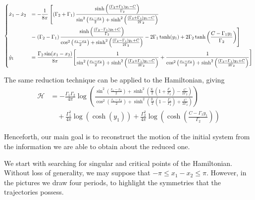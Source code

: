 \documentclass[11pt,twoside]{article}
\theoremstyle{definition}
\numberwithin{equation}{section}
\begin{document}
\begin{footnotesize}
    \begin{equation}
        \begin{dcases}
        \dot{x}_1-\dot{x}_2 &= -\frac{1}{8\pi}\left[\left(\Gamma_2 + \Gamma_1\right)\frac{\sinh\left(\frac{(\Gamma_2+\Gamma_1)y_1-C}{\Gamma_2}\right)}{\sin^2\left(\frac{x_1-x_2}{2}\right) + \sinh^2\left(\frac{(\Gamma_2+\Gamma_1)y_1-C}{2\Gamma_2}\right)}\right. \\
        &-\left.\left(\Gamma_2-\Gamma_1\right)\frac{\sinh\left(\frac{(\Gamma_2-\Gamma_1)y_1+ C}{\Gamma_2}\right)}{\cos^2\left(\frac{x_1-x_2}{2}\right) +
        \sinh^2\left(\frac{(\Gamma_2-\Gamma_1)y_1+ C}{2\Gamma_2}\right)} - 2\Gamma_1\tanh(y_1) + 2\Gamma_2\tanh\left(\frac{C - \Gamma_1y_1}{\Gamma_2}\right)\right]\\
       \dot{y}_1 &= \frac{\Gamma_2\sin(x_1-x_2)}{8\pi} \Bigg[\frac{1}{\sin^2\left(\frac{x_1-x_2}{2}\right) +
        \sinh^2\left(\frac{(\Gamma_2+\Gamma_1)y_1-C}{2\Gamma_2}\right)} + \frac{1}{\cos^2\left(\frac{x_1-x_2}{2}\right)+ \sinh^2\left(\frac{(\Gamma_2-\Gamma_1)y_1+ C}{2\Gamma_2}\right)}\Bigg]
        \end{dcases}    
    \end{equation}
\end{footnotesize}

The same reduction technique can be applied to the Hamiltonian, giving
\begin{equation}
\label{Hamred}
    \begin{split}
        \mathcal{H} &=-\frac{\Gamma_1\Gamma_2}{4\pi}\log\left(\frac{\sin^2\left(\frac{x_1-x_2}{2}\right) + \sinh^2\left(\frac{y_1}{2}\left(1 + \frac{\Gamma_1}{\Gamma_2}\right) - \frac{C}{2\Gamma_2}\right)}{\cos^2\left(\frac{x_1-x_2}{2}\right) + \sinh^2\left(\frac{y_1}{2}\left(1 - \frac{\Gamma_1}{\Gamma_2}\right) + \frac{C}{2\Gamma_2}\right)}\right) \\ &\quad+ \frac{\Gamma_1^2}{4\pi}\log\left(\cosh(y_1)\right) + \frac{\Gamma_2^2}{4\pi}\log\left(\cosh\left(\frac{C-\Gamma_1y_1}{\Gamma_2}\right)\right)
    \end{split}
\end{equation}

Henceforth, our main goal is to reconstruct the motion of the initial system from the information we are able to obtain about the reduced one. 


We start with searching for singular and critical points of the Hamiltonian. Without loss of generality, we may suppose that $-\pi\le x_1-x_2\le\pi$. However, in the pictures we draw four periods, to highlight the symmetries that the trajectories possess. 
\end{document}
